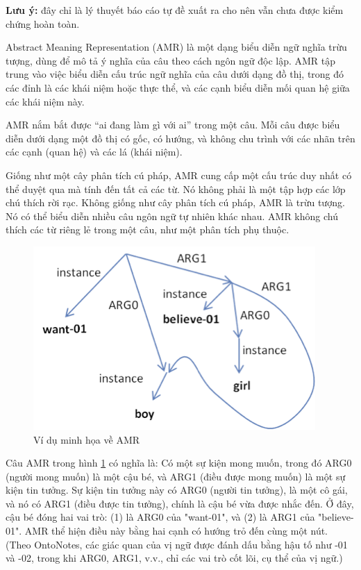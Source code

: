 \textbf{Lưu ý:} đây chỉ là lý thuyết báo cáo tự đề xuất ra cho nên vẫn chưa được kiểm chứng hoàn toàn.

Abstract Meaning Representation (AMR) là một dạng biểu diễn ngữ nghĩa trừu tượng, dùng để mô tả ý nghĩa của câu theo cách ngôn ngữ độc lập\cite{amr-guidelines}. AMR tập trung vào việc biểu diễn cấu trúc ngữ nghĩa của câu dưới dạng đồ thị, trong đó các đỉnh là các khái niệm hoặc thực thể, và các cạnh biểu diễn mối quan hệ giữa các khái niệm này.

AMR nắm bắt được “ai đang làm gì với ai” trong một câu. Mỗi câu được biểu diễn dưới dạng một đồ thị có gốc, có hướng, và không chu trình với các nhãn trên các cạnh (quan hệ) và các lá (khái niệm)\cite{amr-guidelines}.

Giống như một cây phân tích cú pháp, AMR cung cấp một cấu trúc duy nhất có thể duyệt qua mà tính đến tất cả các từ. Nó không phải là một tập hợp các lớp chú thích rời rạc. Không giống như cây phân tích cú pháp, AMR là trừu tượng. Nó có thể biểu diễn nhiều câu ngôn ngữ tự nhiên khác nhau. AMR không chú thích các từ riêng lẻ trong một câu, như một phân tích phụ thuộc\cite{amr-guidelines}.

\begin{figure}[H]
    \centering
    \includegraphics[width=1\linewidth]{Images/GDL/amr_ex.png}
    \caption{Ví dụ minh họa về AMR\cite{amr-guidelines}}
    \label{fig:ex_amr}
\end{figure}

Câu AMR trong hình \ref{fig:ex_amr} có nghĩa là: Có một sự kiện mong muốn, trong đó ARG0 (người mong muốn) là một cậu bé, và ARG1 (điều được mong muốn) là một sự kiện tin tưởng. Sự kiện tin tưởng này có ARG0 (người tin tưởng), là một cô gái, và nó có ARG1 (điều được tin tưởng), chính là cậu bé vừa được nhắc đến. Ở đây, cậu bé đóng hai vai trò: (1) là ARG0 của "want-01", và (2) là ARG1 của "believe-01". AMR thể hiện điều này bằng hai cạnh có hướng trỏ đến cùng một nút. (Theo OntoNotes, các giác quan của vị ngữ được đánh dấu bằng hậu tố như -01 và -02, trong khi ARG0, ARG1, v.v., chỉ các vai trò cốt lõi, cụ thể của vị ngữ.)

